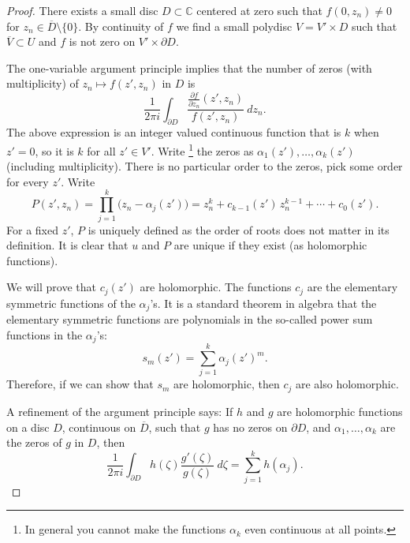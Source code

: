 \documentclass[12pt,openany]{book}
\newcommand{\C}{{\mathbb{C}}}
\theoremstyle{plain}
\theoremstyle{remark}
\theoremstyle{definition}
\theoremstyle{exercise}
\theoremstyle{example}
\begin{document}
\begin{proof}
There exists a small disc $D \subset \C$ centered at zero such that
$f(0,z_n) \not= 0$ for $z_n \in \overline{D} \setminus \{ 0 \}$.
By continuity
of $f$ we find a small polydisc $V = V' \times D$ such that
$\overline{V} \subset U$ and $f$ is not zero on
$V' \times \partial D$.

The one-variable argument principle implies that the number of zeros (with
multiplicity) of $z_n
\mapsto f(z',z_n)$ in $D$ is
\begin{equation*}
\frac{1}{2\pi i}
\int_{\partial D}
\frac{\frac{\partial f}{\partial z_n} (z',z_n)}{f(z',z_n)} ~dz_n .
\end{equation*}
The above expression is an integer valued
continuous function that is $k$ when $z'=0$,
so it is $k$ for all $z' \in V'$.
Write%
\footnote{In general you cannot make the
functions $\alpha_k$ even continuous at all points.}
the zeros as $\alpha_1(z'),\ldots,\alpha_k(z')$ (including
multiplicity).  There is no particular order to the zeros,
pick some order for every $z'$.
Write
\begin{equation*}
P(z',z_n)
=
\prod_{j=1}^k \bigl(z_n-\alpha_j(z')\bigr)
=
z_n^k + c_{k-1}(z') \, z_n^{k-1} + \cdots + c_0 (z') .
\end{equation*}
For a fixed $z'$, $P$ is uniquely defined as the order of roots does not
matter in its definition.  It is
clear that
$u$ and $P$ are unique if they exist (as holomorphic functions).

We will prove that $c_j(z')$ are holomorphic.  The functions $c_j$ are
the elementary symmetric functions of the $\alpha_j$'s.  It is a standard
theorem in algebra that the elementary symmetric functions are
polynomials in the so-called power sum functions in the $\alpha_j$'s:
\begin{equation*}
s_m(z') = \sum_{j=1}^k \alpha_j{(z')}^m .
\end{equation*}
Therefore, if we can show that $s_m$ are holomorphic, then $c_j$ are also
holomorphic.

A refinement of the argument principle says:
If $h$ and $g$ are
holomorphic functions on a disc $D$, continuous on $\overline{D}$,
such that $g$ has no zeros on $\partial D$, and $\alpha_1,\ldots,\alpha_k$
are the zeros of $g$ in $D$, then
\begin{equation*}
\frac{1}{2 \pi i}
\int_{\partial D} h(\zeta) \frac{g'(\zeta)}{g(\zeta)} ~d\zeta
= \sum_{j=1}^k h(\alpha_j) .
\end{equation*}


\end{proof}
\end{document}

